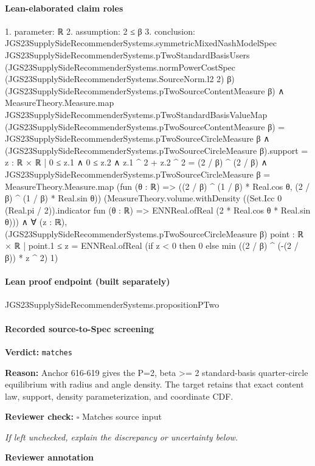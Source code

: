 \documentclass[10pt]{article}
\newcommand{\reviewerbox}{%
  \par\noindent\fbox{\parbox{0.96\linewidth}{\rule{0pt}{0.38in}}}\par
}
\newcommand{\reviewmatch}[1]{%
  \par\noindent\textbf{Reviewer check:} $\square$\; #1\par
  \noindent\emph{If left unchecked, explain the discrepancy or uncertainty below.}\par
}
\begin{document}
\paragraph{Lean-elaborated claim roles}\begin{ReviewVerbatim}
1. parameter: ℝ
2. assumption: 2 ≤ β
3. conclusion: JGS23SupplySideRecommenderSystems.symmetricMixedNashModelSpec JGS23SupplySideRecommenderSystems.pTwoStandardBasisUsers
    (JGS23SupplySideRecommenderSystems.normPowerCostSpec (JGS23SupplySideRecommenderSystems.SourceNorm.l2 2) β)
    (JGS23SupplySideRecommenderSystems.pTwoSourceContentMeasure β) ∧
  MeasureTheory.Measure.map JGS23SupplySideRecommenderSystems.pTwoStandardBasisValueMap
        (JGS23SupplySideRecommenderSystems.pTwoSourceContentMeasure β) =
      JGS23SupplySideRecommenderSystems.pTwoSourceCircleMeasure β ∧
    (JGS23SupplySideRecommenderSystems.pTwoSourceCircleMeasure β).support =
        {z : ℝ × ℝ | 0 ≤ z.1 ∧ 0 ≤ z.2 ∧ z.1 ^ 2 + z.2 ^ 2 = (2 / β) ^ (2 / β)} ∧
      JGS23SupplySideRecommenderSystems.pTwoSourceCircleMeasure β =
          MeasureTheory.Measure.map (fun (θ : ℝ) => ((2 / β) ^ (1 / β) * Real.cos θ, (2 / β) ^ (1 / β) * Real.sin θ))
            (MeasureTheory.volume.withDensity
              ((Set.Icc 0 (Real.pi / 2)).indicator fun (θ : ℝ) => ENNReal.ofReal (2 * Real.cos θ * Real.sin θ))) ∧
        ∀ (z : ℝ),
          (JGS23SupplySideRecommenderSystems.pTwoSourceCircleMeasure β) {point : ℝ × ℝ | point.1 ≤ z} =
            ENNReal.ofReal (if z < 0 then 0 else min ((2 / β) ^ (-(2 / β)) * z ^ 2) 1)
\end{ReviewVerbatim}

\paragraph{Lean proof endpoint (built separately)}\begin{ReviewVerbatim}
JGS23SupplySideRecommenderSystems.propositionPTwo
\end{ReviewVerbatim}

\paragraph{Recorded source-to-Spec screening}
\textbf{Verdict:} \texttt{matches}
\\
{\raggedright
\textbf{Reason:} Anchor 616-\allowbreak{}619 gives the P=2, beta >= 2 standard-\allowbreak{}basis quarter-\allowbreak{}circle equilibrium with radius and angle density.\allowbreak{}  The target retains that exact content law, support, density parameterization, and coordinate CDF.\allowbreak{}
\par}
\reviewmatch{Matches source input}
\noindent\textbf{Reviewer annotation}\par
\reviewerbox
\clearpage
\hypertarget{source-claim-32f245f5fbb8fcc5}{}
\end{document}
